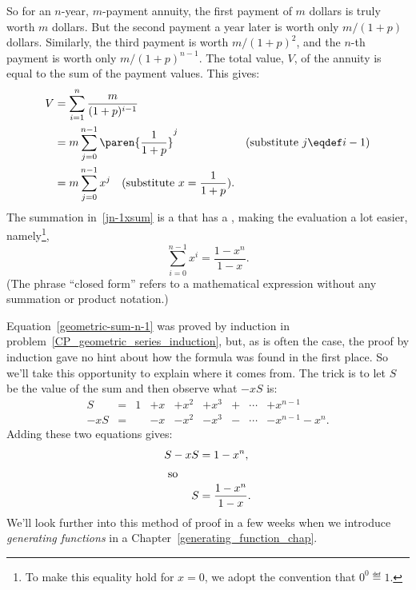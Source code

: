 So for an $n$-year, $m$-payment annuity, the first payment of $m$ dollars
is truly worth $m$ dollars.  But the second payment a year later is worth
only $m/(1+p)$ dollars.  Similarly, the third payment is worth
$m/(1+p)^2$, and the $n$-th payment is worth only $m/(1+p)^{n-1}$.  The
total value, $V$, of the annuity is equal to the sum of the payment
values.  This gives:
\begin{align}
V & = \sum_{i=1}^n \frac{m}{(1+p)^{i-1}}\notag\\
  & = m \sum_{j=0}^{n-1} \paren{\frac{1}{1+p}}^j & \text{(substitute $j \eqdef i-1$)}\notag\\
  & = m \sum_{j=0}^{n-1} x^j \quad (\mbox{substitute} \ x = \frac{1}{1+p}).\label{jn-1xsum}
\end{align}
The summation in~\eqref{jn-1xsum} is a  that has a
, making the evaluation a lot easier, namely\footnote{To
  make this equality hold for $x=0$, we adopt the convention that $0^0
  \eqdef 1$.},
\begin{equation}\label{geometric-sum-n-1}
\sum_{i=0}^{n-1} x^i = \frac{1- x^n}{1 - x}.
\end{equation}
(The phrase ``closed form'' refers to a mathematical expression without
any summation or product notation.)

Equation~\eqref{geometric-sum-n-1} was proved by induction in
problem~\ref{CP_geometric_series_induction}, but, as is often the case,
the proof by induction gave no hint about how the formula was found in the
first place.  So we'll take this opportunity to explain where it comes
from.  The trick is to let $S$ be the value of the sum and then observe
what $-xS$ is:
\[\begin{array}{rclllllcl}
  S & = & 1 & +  x & + x^2 & + x^3 & + &\cdots & + x^{n-1} \\
-xS & = &   & -  x & - x^2 & - x^3 & - &\cdots & - x^{n-1} - x^{n}.
\end{array}\]
Adding these two equations gives:
\begin{align*}
S-xS  & =  1 - x^n, \\
\intertext{  so}
S     & = \frac{1 - x^n}{1 - x}.
\end{align*}
We'll look further into this method of proof in a few weeks when we
introduce \emph{generating functions} in a
Chapter~\ref{generating_function_chap}.

\iffalse


